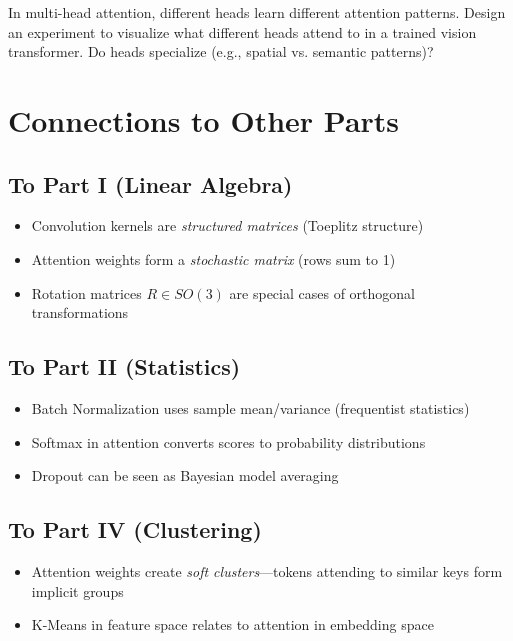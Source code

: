\begin{exercise}
	In multi-head attention, different heads learn different attention patterns. Design an experiment to visualize what different heads attend to in a trained vision transformer. Do heads specialize (e.g., spatial vs. semantic patterns)?
\end{exercise}

\section{Connections to Other Parts}

\subsection{To Part I (Linear Algebra)}
\begin{itemize}
	\item Convolution kernels are \textit{structured matrices} (Toeplitz structure)
	\item Attention weights form a \textit{stochastic matrix} (rows sum to 1)
	\item Rotation matrices $R \in SO(3)$ are special cases of orthogonal transformations
\end{itemize}

\subsection{To Part II (Statistics)}
\begin{itemize}
	\item Batch Normalization uses sample mean/variance (frequentist statistics)
	\item Softmax in attention converts scores to probability distributions
	\item Dropout can be seen as Bayesian model averaging
\end{itemize}

\subsection{To Part IV (Clustering)}
\begin{itemize}
	\item Attention weights create \textit{soft clusters}---tokens attending to similar keys form implicit groups
	\item K-Means in feature space relates to attention in embedding space
\end{itemize}

